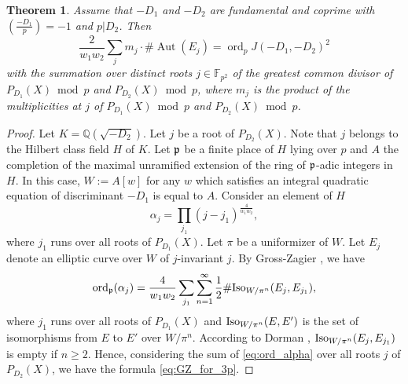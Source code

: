 \documentclass[a4paper, 11pt]{article}
\theoremstyle{plain}
\newtheorem{thm}[defn]{Theorem}
\newcommand{\?}{\textcolor{red}{??}}
\newcommand{\F}{\mathbb{F}}
\newcommand{\ord}{{\operatorname{ord}}}
\newcommand{\Aut}{{\operatorname{Aut}}}
\begin{document}
\begin{thm}\label{thm:GZ_for_3p}
Assume  that $-D_1$ and $-D_2$ are fundamental and coprime with $\left(\frac{-D_1}{p}\right) = -1$ and $p|D_2$. 
Then  
\begin{equation}\label{eq:GZ_for_3p}
\frac{2}{w_1w_2}
\sum_{j}
m_j\cdot \#\Aut(E_j)=    \ord_p J(-D_1, -D_2)^2
\end{equation}
with the summation over distinct roots $j\in\F_{p^2}$ of the greatest common divisor of $P_{D_1}(X) \bmod p$ and $P_{D_2}(X) \bmod p$, where $m_j$ is the product of the multiplicities at $j$ of $P_{D_1}(X) \bmod p$ and $P_{D_2}(X) \bmod p$.
\end{thm}
\begin{proof}
Let $K={\mathbb Q}(\sqrt{-D_2})$.
Let $j$ be a root of $P_{D_2}(X)$. Note that $j$ belongs to the Hilbert class field $H$ of $K$. Let $\frak p$ be a finite place of $H$ lying over $p$
and $A$ the completion of the maximal unramified extension of the ring of $\frak p$-adic integers in $H$. In this case, $W:=A[w]$ for any $w$ which satisfies an integral quadratic equation of discriminant $-D_1$
is equal to $A$. Consider an element of $H$
\[
\alpha_j = \prod_{j_1}(j-j_1)^{\frac{4}{w_1w_2}},
\]
where  $j_1$ runs over all roots of $P_{D_1}(X)$.
Let $\pi$ be a uniformizer of $W$. Let $E_j$ denote an elliptic curve over $W$ of $j$-invariant $j$. 
By Gross-Zagier \cite[3.2]{GZ}, we have
\begin{equation}\label{eq:ord_alpha}
{\rm ord}_{\frak p}(\alpha_j) = \frac{4}{w_1w_2}\sum_{j_1}\sum_{n=1}^\infty \frac{1}{2}\# {\rm Iso}_{W/\pi^n}(E_j,E_{j_1}),
\end{equation}
where $j_1$ runs over all roots of $P_{D_1}(X)$ and ${\rm Iso}_{W/\pi^n}(E,E')$ is the set of isomorphisms from $E$ to $E'$ over $W/\pi^n$.
According to Dorman \cite[Theorem 3.13]{Dorman},  ${\rm Iso}_{W/\pi^n}(E_j,E_{j_1})$ is empty if $n\ge 2$. 
Hence, considering the sum of \eqref{eq:ord_alpha} over all roots $j$ of $P_{D_2}(X)$, we have the formula \eqref{eq:GZ_for_3p}.
\end{proof}
\end{document}
